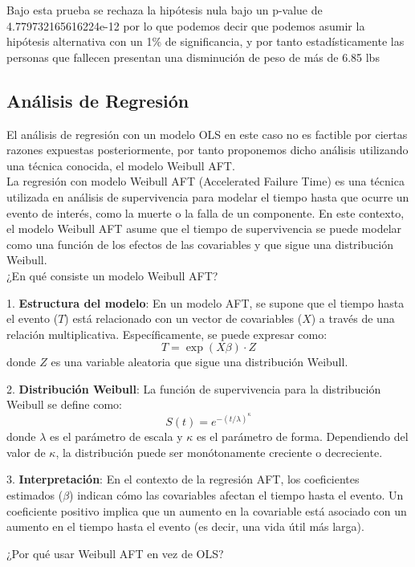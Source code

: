 \documentclass[a4paper,12pt]{article}
\begin{document}
Bajo esta prueba se rechaza la hipótesis nula bajo un p-value de 4.779732165616224e-12 por lo que podemos decir que podemos asumir la hipótesis alternativa con un 1\% de significancia, y por tanto estadísticamente las personas que fallecen presentan una disminución de peso de más de 6.85 lbs

\subsection*{Análisis de Regresión}


El análisis de regresión con un modelo OLS en este caso no es factible por ciertas razones expuestas posteriormente, por tanto proponemos dicho análisis utilizando una técnica conocida, el modelo Weibull AFT. \\
La regresión con modelo Weibull AFT (Accelerated Failure Time) es una técnica utilizada en análisis de supervivencia para modelar el tiempo hasta que ocurre un evento de interés, como la muerte o la falla de un componente.
 En este contexto, el modelo Weibull AFT asume que el tiempo de supervivencia se puede modelar como una función de los efectos de las covariables y que sigue una distribución Weibull.\\

¿En qué consiste un modelo Weibull AFT?

1. \textbf{Estructura del modelo}: En un modelo AFT, se supone que el tiempo hasta el evento ($T$) está relacionado con un vector de covariables ($X$) a través de una relación multiplicativa. Específicamente, se puede expresar como:
   \[
   T = \exp(X\beta) \cdot Z
   \]
   donde $Z$ es una variable aleatoria que sigue una distribución Weibull.

2. \textbf{Distribución Weibull}: La función de supervivencia para la distribución Weibull se define como:
   \[
   S(t) = e^{-(t/\lambda)^\kappa}
   \]
   donde $\lambda$ es el parámetro de escala y $\kappa$ es el parámetro de forma. Dependiendo del valor de $\kappa$, la distribución puede ser monótonamente creciente o decreciente.

3. \textbf{Interpretación}: En el contexto de la regresión AFT, los coeficientes estimados ($\beta$) indican cómo las covariables afectan el tiempo hasta el evento. Un coeficiente positivo implica que un aumento en la covariable está asociado con un aumento en el tiempo hasta el evento (es decir, una vida útil más larga).

¿Por qué usar Weibull AFT en vez de OLS?
\end{document}
